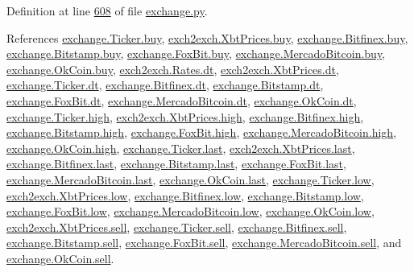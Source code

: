 Definition at line \hyperlink{exchange_8py_source_l00608}{608} of file \hyperlink{exchange_8py_source}{exchange.\+py}.



References \hyperlink{exchange_8py_source_l00058}{exchange.\+Ticker.\+buy}, \hyperlink{exch2exch_8py_source_l00059}{exch2exch.\+Xbt\+Prices.\+buy}, \hyperlink{exchange_8py_source_l00331}{exchange.\+Bitfinex.\+buy}, \hyperlink{exchange_8py_source_l00400}{exchange.\+Bitstamp.\+buy}, \hyperlink{exchange_8py_source_l00472}{exchange.\+Fox\+Bit.\+buy}, \hyperlink{exchange_8py_source_l00534}{exchange.\+Mercado\+Bitcoin.\+buy}, \hyperlink{exchange_8py_source_l00599}{exchange.\+Ok\+Coin.\+buy}, \hyperlink{exch2exch_8py_source_l00028}{exch2exch.\+Rates.\+dt}, \hyperlink{exch2exch_8py_source_l00057}{exch2exch.\+Xbt\+Prices.\+dt}, \hyperlink{exchange_8py_source_l00057}{exchange.\+Ticker.\+dt}, \hyperlink{exchange_8py_source_l00338}{exchange.\+Bitfinex.\+dt}, \hyperlink{exchange_8py_source_l00407}{exchange.\+Bitstamp.\+dt}, \hyperlink{exchange_8py_source_l00471}{exchange.\+Fox\+Bit.\+dt}, \hyperlink{exchange_8py_source_l00541}{exchange.\+Mercado\+Bitcoin.\+dt}, \hyperlink{exchange_8py_source_l00606}{exchange.\+Ok\+Coin.\+dt}, \hyperlink{exchange_8py_source_l00060}{exchange.\+Ticker.\+high}, \hyperlink{exch2exch_8py_source_l00061}{exch2exch.\+Xbt\+Prices.\+high}, \hyperlink{exchange_8py_source_l00333}{exchange.\+Bitfinex.\+high}, \hyperlink{exchange_8py_source_l00402}{exchange.\+Bitstamp.\+high}, \hyperlink{exchange_8py_source_l00474}{exchange.\+Fox\+Bit.\+high}, \hyperlink{exchange_8py_source_l00536}{exchange.\+Mercado\+Bitcoin.\+high}, \hyperlink{exchange_8py_source_l00601}{exchange.\+Ok\+Coin.\+high}, \hyperlink{exchange_8py_source_l00062}{exchange.\+Ticker.\+last}, \hyperlink{exch2exch_8py_source_l00063}{exch2exch.\+Xbt\+Prices.\+last}, \hyperlink{exchange_8py_source_l00335}{exchange.\+Bitfinex.\+last}, \hyperlink{exchange_8py_source_l00404}{exchange.\+Bitstamp.\+last}, \hyperlink{exchange_8py_source_l00476}{exchange.\+Fox\+Bit.\+last}, \hyperlink{exchange_8py_source_l00538}{exchange.\+Mercado\+Bitcoin.\+last}, \hyperlink{exchange_8py_source_l00603}{exchange.\+Ok\+Coin.\+last}, \hyperlink{exchange_8py_source_l00061}{exchange.\+Ticker.\+low}, \hyperlink{exch2exch_8py_source_l00062}{exch2exch.\+Xbt\+Prices.\+low}, \hyperlink{exchange_8py_source_l00334}{exchange.\+Bitfinex.\+low}, \hyperlink{exchange_8py_source_l00403}{exchange.\+Bitstamp.\+low}, \hyperlink{exchange_8py_source_l00475}{exchange.\+Fox\+Bit.\+low}, \hyperlink{exchange_8py_source_l00537}{exchange.\+Mercado\+Bitcoin.\+low}, \hyperlink{exchange_8py_source_l00602}{exchange.\+Ok\+Coin.\+low}, \hyperlink{exch2exch_8py_source_l00058}{exch2exch.\+Xbt\+Prices.\+sell}, \hyperlink{exchange_8py_source_l00059}{exchange.\+Ticker.\+sell}, \hyperlink{exchange_8py_source_l00332}{exchange.\+Bitfinex.\+sell}, \hyperlink{exchange_8py_source_l00401}{exchange.\+Bitstamp.\+sell}, \hyperlink{exchange_8py_source_l00473}{exchange.\+Fox\+Bit.\+sell}, \hyperlink{exchange_8py_source_l00535}{exchange.\+Mercado\+Bitcoin.\+sell}, and \hyperlink{exchange_8py_source_l00600}{exchange.\+Ok\+Coin.\+sell}.


